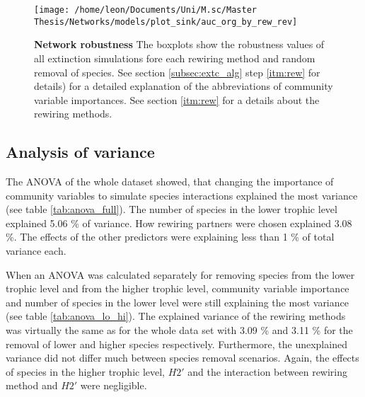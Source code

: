 \documentclass[12pt,a4paper]{article}
\begin{document}
\begin{figure}[H]
	 \centering
	 \texttt{[image: /home/leon/Documents/Uni/M.sc/Master Thesis/Networks/models/plot\_sink/auc\_org\_by\_rew\_rev]}
	 \captionsetup{width = .8\textwidth}
	 \caption{\textbf{Network robustness } The boxplots show the robustness values of all extinction simulations fore each rewiring method and random removal of species. See section \ref{subsec:extc_alg} step \ref{itm:rew} for details) for a detailed explanation of the abbreviations of community variable importances. See section \ref{itm:rew} for a details about the rewiring methods.}
	 \label{fig:auc_org_rew}
\end{figure}

\subsection{Analysis of variance}
The ANOVA of the whole dataset showed, that changing the importance of community variables to simulate species interactions explained the most variance (see table \ref{tab:anova_full}). The number of species in the lower trophic level explained 5.06 \% of variance. How rewiring partners were chosen explained 3.08 \%. The effects of the other predictors were explaining less than 1 \% of total variance each.

When an ANOVA was calculated separately for removing species from the lower trophic level and from the higher trophic level, community variable importance and number of species in the lower level were still explaining the most variance (see table \ref{tab:anova_lo_hi}). The explained variance of the rewiring methods was virtually the same as for the whole data set with 3.09 \% and 3.11 \% for the removal of lower and higher species respectively. Furthermore, the unexplained variance did not differ much between species removal scenarios. Again, the effects of species in the higher trophic level, $H2'$ and the interaction between rewiring method and $H2'$ were negligible. \paragraph{}
\end{document}

